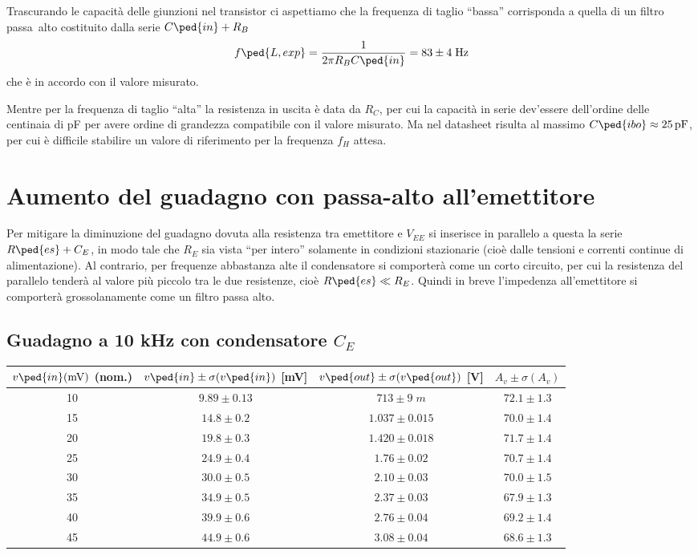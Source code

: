 \documentclass[10pt,a4paper]{article}
\begin{document}
Trascurando le capacità delle giunzioni nel transistor ci aspettiamo che
la frequenza di taglio ``bassa'' corrisponda a quella di un filtro passa~alto
costituito dalla serie $C\ped{in} + R_B$
\begin{equation}
f\ped{L, exp} = \frac{1}{2\pi R_B C\ped{in}} = 83 \pm 4 \; \si{\Hz}
\end{equation} 
che è in accordo con il valore misurato.

Mentre per la frequenza di taglio ``alta'' la resistenza in uscita è data
da $R_C$, per cui la capacità in serie dev'essere dell'ordine delle centinaia
di pF per avere ordine di grandezza compatibile con il valore misurato.
Ma nel datasheet risulta al massimo $C\ped{ibo} \approx \SI{25}{p\F}$, per cui
è difficile stabilire un valore di riferimento per la frequenza $f_H$ attesa.

\section{Aumento del guadagno con passa-alto all'emettitore}
Per mitigare la diminuzione del guadagno dovuta alla resistenza tra emettitore
e $V_{EE}$ si inserisce in parallelo a questa la serie $R\ped{es} + C_E$,
in modo tale che $R_E$ sia vista ``per intero'' solamente in condizioni
stazionarie (cioè dalle tensioni e correnti continue di alimentazione).
Al contrario, per frequenze abbastanza alte il condensatore si comporterà come
un corto circuito, per cui la resistenza del parallelo tenderà al valore più
piccolo tra le due resistenze, cioè $R\ped{es} \ll R_E$.
Quindi in breve l'impedenza all'emettitore si comporterà grossolanamente
come un filtro passa alto.

\subsection{Guadagno a 10 kHz con condensatore $C_E$}
\begin{table}[htb]
\centering
\begin{tabular}{cccc}
\toprule
$v\ped{in}(\si{m\V})$ (nom.) & $v\ped{in} \pm \sigma(v\ped{in})$ [mV] & $v\ped{out} \pm \sigma(v\ped{out})$ [V] & $A_v \pm \sigma(A_v)$ \\
\midrule
\midrule
10 & $9.89 \pm 0.13$ & $713 \pm 9 \; \si{m}$ & $72.1 \pm 1.3$ \\
15 & $14.8 \pm 0.2$ & $1.037 \pm 0.015$ & $70.0 \pm 1.4$ \\
20 & $19.8 \pm 0.3$ & $1.420 \pm 0.018$ & $71.7 \pm 1.4$ \\
25 & $24.9 \pm 0.4$ & $1.76 \pm 0.02$ & $ 70.7 \pm 1.4$ \\
30 & $30.0 \pm 0.5$ & $2.10 \pm 0.03$ & $ 70.0 \pm 1.5$ \\
35 & $34.9 \pm 0.5$ & $2.37 \pm 0.03$ & $ 67.9 \pm 1.3$ \\
40 & $39.9 \pm 0.6$ & $2.76 \pm 0.04$ & $ 69.2 \pm 1.4$ \\
45 & $44.9 \pm 0.6$ & $3.08 \pm 0.04$ & $ 68.6 \pm 1.3$ \\
\bottomrule
\end{tabular}
\end{table}
\end{document}
